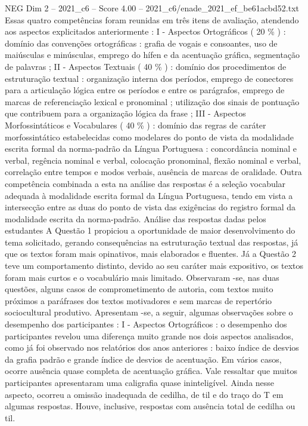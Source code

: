 \begin{textsample}{NEG Dim 2 – 2021\_c6 – Score 4.00 – 2021\_c6/enade\_2021\_ef\_be61acbd52.txt}
Essas quatro competências foram reunidas em três itens de avaliação, atendendo aos aspectos explicitados anteriormente : I - Aspectos Ortográficos ( 20 \% ) : domínio das convenções ortográficas : grafia de vogais e consoantes, uso de maiúsculas e minúsculas, emprego do hífen e da acentuação gráfica, segmentação de palavras ; II - Aspectos Textuais ( 40 \% ) : domínio dos procedimentos de estruturação textual : organização interna dos períodos, emprego de conectores para a articulação lógica entre os períodos e entre os parágrafos, emprego de marcas de referenciação lexical e pronominal ; utilização dos sinais de pontuação que contribuem para a organização lógica da frase ; III - Aspectos Morfossintáticos e Vocabulares ( 40 \% ) : domínio das regras de caráter morfossintático estabelecidas como modelares do ponto de vista da modalidade escrita formal da norma-padrão da Língua Portuguesa : concordância nominal e verbal, regência nominal e verbal, colocação pronominal, flexão nominal e verbal, correlação entre tempos e modos verbais, ausência de marcas de oralidade.
Outra competência combinada a esta na análise das respostas é a seleção vocabular adequada à modalidade escrita formal da Língua Portuguesa, tendo em vista a intersecção entre as duas do ponto de vista das exigências do registro formal da modalidade escrita da norma-padrão.
Análise das respostas dadas pelos estudantes A Questão 1 propiciou a oportunidade de maior desenvolvimento do tema solicitado, gerando consequências na estruturação textual das respostas, já que os textos foram mais opinativos, mais elaborados e fluentes.
Já a Questão 2 teve um comportamento distinto, devido ao seu caráter mais expositivo, os textos foram mais curtos e o vocabulário mais limitado.
Observaram -se, nas duas questões, alguns casos de comprometimento de autoria, com textos muito próximos a paráfrases dos textos motivadores e sem marcas de repertório sociocultural produtivo.
Apresentam -se, a seguir, algumas observações sobre o desempenho dos participantes : I - Aspectos Ortográficos : o desempenho dos participantes revelou uma diferença muito grande nos dois aspectos analisados, como já foi observado nos relatórios dos anos anteriores : baixo índice de desvios da grafia padrão e grande índice de desvios de acentuação.
Em vários casos, ocorre ausência quase completa de acentuação gráfica.
Vale ressaltar que muitos participantes apresentaram uma caligrafia quase ininteligível.
Ainda nesse aspecto, ocorreu a omissão inadequada de cedilha, de til e do traço do T em algumas respostas.
Houve, inclusive, respostas com ausência total de cedilha ou til.

\end{textsample}
